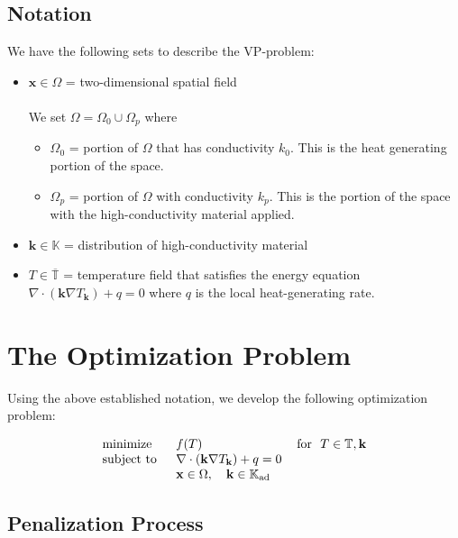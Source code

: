 \documentclass[11pt]{article}
\begin{document}
\subsection{Notation}

We have the following sets to describe the VP-problem:

\begin{itemize}
	\item $\mathbf{x}\in\Omega$ = two-dimensional spatial field\\\\
	We set $\Omega = \Omega_0\cup\Omega_p$ where
	\begin{itemize}
		\item $\Omega_0$ = portion of $\Omega$ that has conductivity $k_0$. This is the heat generating portion of the space.
		\item $\Omega_p$ = portion of $\Omega$ with conductivity $k_p$. This is the portion of the space with the high-conductivity material applied.
	\end{itemize}
	\item $\mathbf{k}\in\mathbb{K}$ = distribution of high-conductivity material
	\item $T\in\overline{\mathbb{T}}$ = temperature field that satisfies the energy equation {\color{baystate}$\nabla\cdot\left(\mathbf{k}\nabla T_{\mathbf{k}}\right)+q=0$} where $q$ is the local heat-generating rate.
\end{itemize}

\section{The Optimization Problem}

Using the above established notation, we develop the following optimization problem:

{\color{baystate}
	\begin{equation}
		\begin{tabular}{lll}
			\text{minimize }   & $f(T)$ & \text{for } $T\in\mathbb{T},\mathbf{k}$      \\
			\text{subject to } & $\nabla\cdot\left(\mathbf{k}\nabla T_{\mathbf{k}}\right)+q=0$ & \\
			& $\mathbf{x}\in\Omega,\quad\mathbf{k}\in\mathbb{K}_{\text{ad}}$&      
		\end{tabular}\label{SIMP-Optimization-Problem}
	\end{equation}
}

\subsection{Penalization Process}



\nocite{Boyd2004}
\nocite{Gander2018}
\nocite{dawkins_2018}
\nocite{enwiki:1011407395}
\nocite{Shewchuk1994}
\nocite{Svanberg1987}
\nocite{Marck2012}
\end{document}
